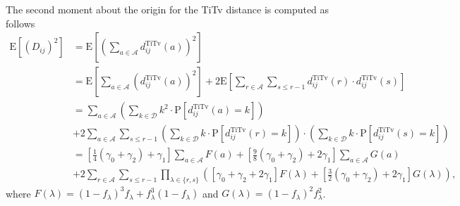 \documentclass[10pt,letterpaper]{article}\usepackage[]{graphicx}\usepackage[]{color}
\begin{document}
The second moment about the origin for the TiTv distance is computed as follows
%
\begin{equation}\label{eq:mu2_DDistr_TiTv}
\begin{aligned}
\text{E}\left[\left(D_{ij}\right)^2\right] &= \text{E}\left[\left(\sum_{a \in \mathcal{A}} d^\text{TiTv}_{ij}(a)\right)^2\right] \\
&= \text{E}\left[\sum_{a \in \mathcal{A}} \left(d^\text{TiTv}_{ij}(a)\right)^2\right] + 2 \text{E}\left[\sum_{r \in \mathcal{A}} \sum_{s \leq r - 1} d^\text{TiTv}_{ij}(r) \cdot d^\text{TiTv}_{ij}(s)\right] \\
&= \sum_{a \in \mathcal{A}} \left(\sum_{k \in \mathcal{D}} k^2 \cdot \text{P}\left[d^\text{TiTv}_{ij}(a) = k\right]\right) \\
&+ 2\sum_{a \in \mathcal{A}} \sum_{s \leq r - 1} \left(\sum_{k \in \mathcal{D}} k \cdot \text{P}\left[d^\text{TiTv}_{ij}(r) = k\right]\right) \cdot \left(\sum_{k \in \mathcal{D}} k \cdot \text{P}\left[d^\text{TiTv}_{ij}(s) = k\right]\right) \\
&= \left[\frac{1}{4}(\gamma_0 + \gamma_2) + \gamma_1\right] \sum_{a \in \mathcal{A}} F(a) + \left[\frac{9}{8}(\gamma_0 + \gamma_2) + 2\gamma_1\right] \sum_{a \in \mathcal{A}} G(a) \\
&+ 2 \sum_{r \in \mathcal{A}} \sum_{s \leq r - 1} \prod_{\lambda \in \{r,s\}} \left([\gamma_0 + \gamma_2 + 2\gamma_1] F(\lambda) + \left[\frac{3}{2}(\gamma_0 + \gamma_2) + 2\gamma_1\right] G(\lambda)\right),
\end{aligned}
\end{equation}
where $F(\lambda) = (1 - f_\lambda)^3 f_\lambda + f^3_\lambda (1 - f_\lambda)$ and $G(\lambda) = (1 - f_\lambda)^2 f^2_\lambda$.
\end{document}
